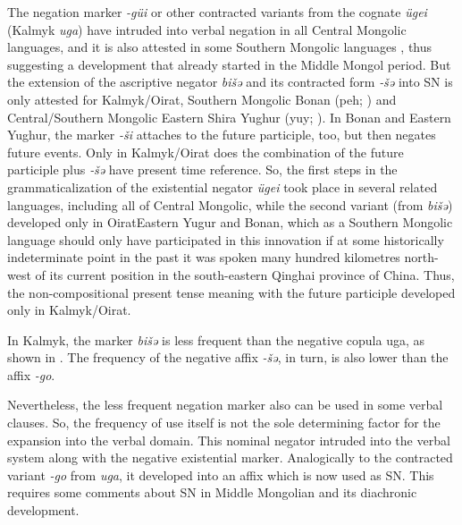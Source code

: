 \documentclass[output=paper]{langsci/langscibook}
\begin{document}
The negation marker \textit{-güi} or other contracted variants from the cognate \textit{ügei} (Kalmyk \textit{uga}) have intruded into verbal negation in all Central Mongolic languages, and it is also attested in some Southern Mongolic languages \citep[70--81]{brosig2015a}, thus suggesting a development that already started in the Middle Mongol period. But the extension of the ascriptive negator \textit{bišǝ} and its contracted form \textit{‑šǝ} into SN is only attested for Kalmyk/Oirat, Southern Mongolic Bonan (peh; \citealp{wu2003a}) and Central/Southern Mongolic Eastern Shira Yughur (yuy; \citealp{nugteren2003a}). In Bonan and Eastern Yughur, the marker \textit{-ši} attaches to the future participle, too, but then negates future events. Only in Kalmyk/Oirat does the combination of the future participle plus \textit{‑šǝ} have present time reference. So, the first steps in the grammaticalization of the existential negator \textit{ügei} took place in several related languages, including all of Central Mongolic, while the second variant (from \textit{bišǝ}) developed only in OiratEastern Yugur and Bonan, which as a Southern Mongolic language should only have participated in this innovation if at some historically indeterminate point in the past it was spoken many hundred kilometres north-west of its current position in the south-eastern Qinghai province of China. Thus, the non-compositional present tense meaning with the future participle developed only in Kalmyk/Oirat.

In Kalmyk, the marker \textit{bišǝ} is less frequent than the negative copula uga, as shown in . The frequency of the negative affix \textit{-šǝ}, in turn, is also lower than the affix \textit{-go}.

\begin{table}[!h]
\caption{Frequency of \textit{bišǝ} and \textit{uga} and negation affixes in the written corpora.}
\label{tab:BK1}
\end{table}

Nevertheless, the less frequent negation marker also can be used in some verbal clauses. So, the frequency of use itself is not the sole determining factor for the expansion into the verbal domain. This nominal negator intruded into the verbal system along with the negative existential marker. Analogically to the contracted variant \textit{-go} from \textit{uga}, it developed into an affix which is now used as SN. This requires some comments about SN in Middle Mongolian and its diachronic development.
\end{document}
